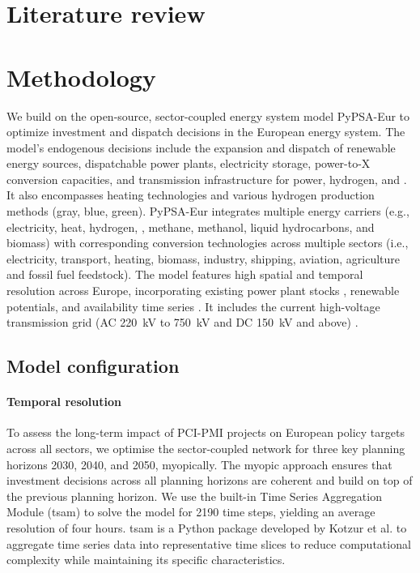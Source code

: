 \documentclass[preprint,12pt]{elsarticle}
\begin{document}
\newpage
\section{Literature review}
\label{sec:literature_review}

\newpage
\section{Methodology}
\label{sec:methodology}

We build on the open-source, sector-coupled energy system model PyPSA-Eur \cite{neumannPotentialRoleHydrogen2023,frysztackiComparisonClusteringMethods2022,glaumOffshorePowerHydrogen2024,horschPyPSAEurOpenOptimisation2018} to optimize investment and dispatch decisions in the European energy system. The model's endogenous decisions include the expansion and dispatch of renewable energy sources, dispatchable power plants, electricity storage, power-to-X conversion capacities, and transmission infrastructure for power, hydrogen, and . It also encompasses heating technologies and various hydrogen production methods (gray, blue, green).
PyPSA-Eur integrates multiple energy carriers (e.g., electricity, heat, hydrogen, , methane, methanol, liquid hydrocarbons, and biomass) with corresponding conversion technologies across multiple sectors (i.e., electricity, transport, heating, biomass, industry, shipping, aviation, agriculture and fossil fuel feedstock). The model features high spatial and temporal resolution across Europe, incorporating existing power plant stocks \cite{gotzensPerformingEnergyModelling2019}, renewable potentials, and availability time series \cite{hofmannAtliteLightweightPython2021}. It includes the current high-voltage transmission grid (AC \SI{220}{kV} to \SI{750}{kV} and DC \SI{150}{kV} and above) \cite{xiongModellingHighvoltageGrid2025}.

\subsection{Model configuration}
\label{sec:model_configuration}


\paragraph{Temporal resolution}
\label{sec:temporal_resolution}
To assess the long-term impact of PCI-PMI projects on European policy targets across all sectors, we optimise the sector-coupled network for three key planning horizons 2030, 2040, and 2050, myopically. The myopic approach ensures that investment decisions across all planning horizons are coherent and build on top of the previous planning horizon. We use the built-in Time Series Aggregation Module (tsam) to solve the model for 2190 time steps, yielding an average resolution of four hours. tsam is a Python package developed by Kotzur et al. \cite{kotzurImpactDifferentTime2018} to aggregate time series data into representative time slices to reduce computational complexity while maintaining its specific characteristics. 
\end{document}
